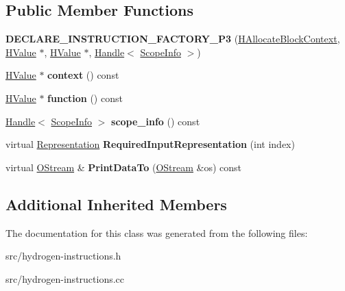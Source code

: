 \subsection*{Public Member Functions}
\begin{DoxyCompactItemize}
\item 
\hypertarget{classv8_1_1internal_1_1_h_allocate_block_context_a6c13957c48ff9395acc20f2cd81524e3}{}{\bfseries D\+E\+C\+L\+A\+R\+E\+\_\+\+I\+N\+S\+T\+R\+U\+C\+T\+I\+O\+N\+\_\+\+F\+A\+C\+T\+O\+R\+Y\+\_\+\+P3} (\hyperlink{classv8_1_1internal_1_1_h_allocate_block_context}{H\+Allocate\+Block\+Context}, \hyperlink{classv8_1_1internal_1_1_h_value}{H\+Value} $\ast$, \hyperlink{classv8_1_1internal_1_1_h_value}{H\+Value} $\ast$, \hyperlink{classv8_1_1internal_1_1_handle}{Handle}$<$ \hyperlink{classv8_1_1internal_1_1_scope_info}{Scope\+Info} $>$)\label{classv8_1_1internal_1_1_h_allocate_block_context_a6c13957c48ff9395acc20f2cd81524e3}

\item 
\hypertarget{classv8_1_1internal_1_1_h_allocate_block_context_a12c32beaa76f6288369fd7191bf69ab8}{}\hyperlink{classv8_1_1internal_1_1_h_value}{H\+Value} $\ast$ {\bfseries context} () const \label{classv8_1_1internal_1_1_h_allocate_block_context_a12c32beaa76f6288369fd7191bf69ab8}

\item 
\hypertarget{classv8_1_1internal_1_1_h_allocate_block_context_a31069317edc832ed0fd0230333846a25}{}\hyperlink{classv8_1_1internal_1_1_h_value}{H\+Value} $\ast$ {\bfseries function} () const \label{classv8_1_1internal_1_1_h_allocate_block_context_a31069317edc832ed0fd0230333846a25}

\item 
\hypertarget{classv8_1_1internal_1_1_h_allocate_block_context_ae21464ab3ebe3218c689bea2da28078c}{}\hyperlink{classv8_1_1internal_1_1_handle}{Handle}$<$ \hyperlink{classv8_1_1internal_1_1_scope_info}{Scope\+Info} $>$ {\bfseries scope\+\_\+info} () const \label{classv8_1_1internal_1_1_h_allocate_block_context_ae21464ab3ebe3218c689bea2da28078c}

\item 
\hypertarget{classv8_1_1internal_1_1_h_allocate_block_context_a8320c17f6711536531d7dc6e05723d92}{}virtual \hyperlink{classv8_1_1internal_1_1_representation}{Representation} {\bfseries Required\+Input\+Representation} (int index)\label{classv8_1_1internal_1_1_h_allocate_block_context_a8320c17f6711536531d7dc6e05723d92}

\item 
\hypertarget{classv8_1_1internal_1_1_h_allocate_block_context_a7c7b12433e51a8771f363311c2030b96}{}virtual \hyperlink{classv8_1_1internal_1_1_o_stream}{O\+Stream} \& {\bfseries Print\+Data\+To} (\hyperlink{classv8_1_1internal_1_1_o_stream}{O\+Stream} \&os) const \label{classv8_1_1internal_1_1_h_allocate_block_context_a7c7b12433e51a8771f363311c2030b96}

\end{DoxyCompactItemize}
\subsection*{Additional Inherited Members}


The documentation for this class was generated from the following files\+:\begin{DoxyCompactItemize}
\item 
src/hydrogen-\/instructions.\+h\item 
src/hydrogen-\/instructions.\+cc\end{DoxyCompactItemize}

